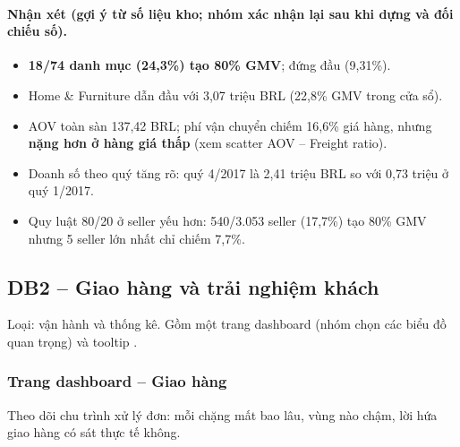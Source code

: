 

\paragraph{Nhận xét (gợi ý từ số liệu kho; \textbf{nhóm xác nhận lại sau khi dựng và đối chiếu số}).}

\begin{itemize}
  \item \textbf{18/74 danh mục (24,3\%) tạo 80\% GMV}; đứng đầu  (9,31\%).
  \item Home \& Furniture dẫn đầu với 3,07 triệu BRL (22,8\% GMV trong cửa sổ).
  \item AOV toàn sàn 137,42 BRL; phí vận chuyển chiếm 16,6\% giá hàng, nhưng \textbf{nặng hơn ở hàng giá thấp} (xem scatter AOV – Freight ratio).
  \item Doanh số theo quý tăng rõ: quý 4/2017 là 2,41 triệu BRL so với 0,73 triệu ở quý 1/2017.
  \item Quy luật 80/20 ở seller yếu hơn: 540/3.053 seller (17,7\%) tạo 80\% GMV nhưng 5 seller lớn nhất chỉ chiếm 7,7\%.
\end{itemize}



\subsection{DB2 -- Giao hàng và trải nghiệm khách}\label{sec:db2}
Loại: vận hành và thống kê. Gồm một trang dashboard (nhóm chọn các biểu đồ quan trọng) và tooltip .

\subsubsection*{Trang dashboard -- Giao hàng}

Theo dõi chu trình xử lý đơn: mỗi chặng mất bao lâu, vùng nào chậm, lời hứa giao hàng có sát thực tế không.

